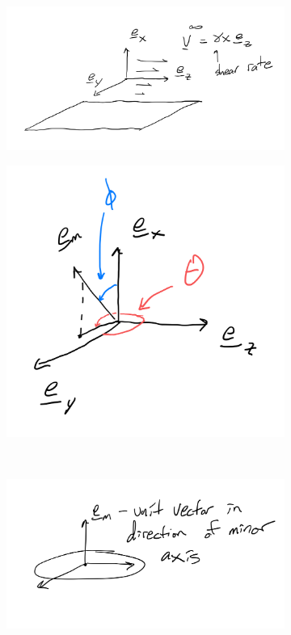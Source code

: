 \documentclass{article}
\begin{document}
\begin{figure}
  \centering
  \begin{subfigure}{0.59\textwidth}
    \includegraphics[width=\textwidth]{axes}
  \end{subfigure}
  \hfill
  \begin{subfigure}{0.39\textwidth}
    \includegraphics[width=\textwidth]{orientation}
  \end{subfigure}
  \\
  \begin{subfigure}{0.49\textwidth}
    \includegraphics[width=\textwidth]{reference}

\end{subfigure}
\end{figure}
\end{document}
